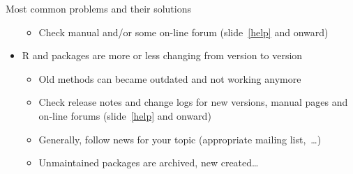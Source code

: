 \documentclass[compress, xelatex, 11pt, xcolor=svgnames, aspectratio=169,
	hyperref={
		bookmarks=true,
		unicode=true,
		colorlinks=true,
		pdftitle={Molecular data in R},
		plainpages=false,
		pdfauthor={Vojtech Zeisek},
		pdfsubject={Course about phylogeny and evolution in R},
		pdfcreator={XeLaTeX},
		pdfkeywords={R, evolution, phylogeny, molecular data},
		linkcolor=Crimson, %
		anchorcolor=Magenta, %
		citecolor=Magenta, %
		filecolor=Magenta, %
		menucolor=Magenta, %
		urlcolor=DodgerBlue, %
		},
	url={hyphens, lowtilde} %
	]{beamer}
\begin{document}
\begin{frame}[allowframebreaks]{Most common problems and their solutions}
\begin{itemize}
		\begin{itemize}
			\item Check manual and/or some on-line forum (slide~\ref{help} and onward)
		\end{itemize}
		\item R and packages are more or less changing from version to version
		\begin{itemize}
			\item Old methods can became outdated and not working anymore
			\item Check release notes and change logs for new versions, manual pages and on-line forums (slide~\ref{help} and onward)
			\item Generally, follow news for your topic (appropriate mailing list,~\ldots)
			\item Unmaintained packages are archived, new created\ldots
		\end{itemize}
	\end{itemize}
\end{frame}
\end{document}
